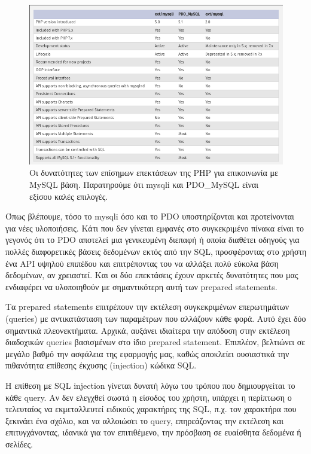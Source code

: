 \documentclass[diploma]{softlab-thesis}
\begin{document}
\begin{figure}
  \centering
  \includegraphics[scale=0.55,trim=4 4 4 4,clip]{Figures/mysqlconnectors.png}
  \caption[Σύγκριση των επεκτάσεων MySQL της PHP]{Οι δυνατότητες των επίσημων
  επεκτάσεων της PHP για επικοινωνία με MySQL βάση. Παρατηρούμε ότι mysqli και
  PDO\_MySQL είναι εξίσου καλές επιλογές.}
\end{figure}

\bigskip

Όπως βλέπουμε, τόσο το mysqli όσο και το PDO υποστηρίζονται και προτείνονται
για νέες υλοποιήσεις. Κάτι που δεν γίνεται εμφανές στο συγκεκριμένο πίνακα
είναι το γεγονός ότι το PDO αποτελεί μια γενικευμένη διεπαφή ή οποία διαθέτει
οδηγούς για πολλές διαφορετικές βάσεις δεδομένων εκτός από την SQL,
προσφέροντας στο χρήστη ένα API υψηλού επιπέδου και επιτρέποντας του να αλλάξει
πολύ εύκολα βάση δεδομένων, αν χρειαστεί. Και οι δύο επεκτάσεις έχουν αρκετές
δυνατότητες που μας ενδιαφέρει να υλοποιηθούν με σημαντικότερη αυτή των
prepared statements.

\bigskip

Τα prepared statements επιτρέπουν την εκτέλεση συγκεκριμένων επερωτημάτων
(queries) με αντικατάσταση των παραμέτρων που αλλάζουν κάθε φορά. Αυτό έχει δύο
σημαντικά πλεονεκτήματα. Αρχικά, αυξάνει ιδιαίτερα την απόδοση στην εκτέλεση
διαδοχικών queries βασισμένων στο ίδιο prepared statement. Επιπλέον, βελτιώνει
σε μεγάλο βαθμό την ασφάλεια της εφαρμογής μας, καθώς αποκλείει ουσιαστικά την
πιθανότητα επίθεσης έκχυσης (injection) κώδικα SQL.

\bigskip

Η επίθεση με SQL injection γίνεται δυνατή λόγω του τρόπου που δημιουργείται το
κάθε query. Αν δεν ελεγχθεί σωστά η είσοδος του χρήστη, υπάρχει η περίπτωση ο
τελευταίος να εκμεταλλευτεί ειδικούς χαρακτήρες της SQL, π.χ. τον χαρακτήρα που
ξεκινάει ένα σχόλιο, και να αλλοιώσει το query, επηρεάζοντας την εκτέλεση και
επιτυγχάνοντας, ιδανικά για τον επιτιθέμενο, την πρόσβαση σε ευαίσθητα δεδομένα
ή σελίδες.
\end{document}

